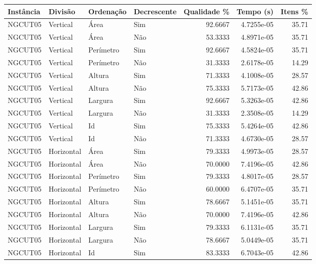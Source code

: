 \begin{tabular}{llllrrr}
\hline
Instância & Divisão     & Ordenação & Decrescente & Qualidade \% & Tempo (s)  & Itens \% \\
\hline
NGCUT05   & Vertical    & Área      & Sim         & 92.6667      & 4.7255e-05 & 35.71    \\
NGCUT05   & Vertical    & Área      & Não         & 53.3333      & 4.8971e-05 & 35.71    \\
NGCUT05   & Vertical    & Perímetro & Sim         & 92.6667      & 4.5824e-05 & 35.71    \\
NGCUT05   & Vertical    & Perímetro & Não         & 31.3333      & 2.6178e-05 & 14.29    \\
NGCUT05   & Vertical    & Altura    & Sim         & 71.3333      & 4.1008e-05 & 28.57    \\
NGCUT05   & Vertical    & Altura    & Não         & 75.3333      & 5.7173e-05 & 42.86    \\
NGCUT05   & Vertical    & Largura   & Sim         & 92.6667      & 5.3263e-05 & 42.86    \\
NGCUT05   & Vertical    & Largura   & Não         & 31.3333      & 2.3508e-05 & 14.29    \\
NGCUT05   & Vertical    & Id        & Sim         & 75.3333      & 5.4264e-05 & 42.86    \\
NGCUT05   & Vertical    & Id        & Não         & 71.3333      & 4.6730e-05 & 28.57    \\
NGCUT05   & Horizontal  & Área      & Sim         & 79.3333      & 4.9973e-05 & 28.57    \\
NGCUT05   & Horizontal  & Área      & Não         & 70.0000      & 7.4196e-05 & 42.86    \\
NGCUT05   & Horizontal  & Perímetro & Sim         & 79.3333      & 4.8017e-05 & 28.57    \\
NGCUT05   & Horizontal  & Perímetro & Não         & 60.0000      & 6.4707e-05 & 35.71    \\
NGCUT05   & Horizontal  & Altura    & Sim         & 78.6667      & 5.1451e-05 & 35.71    \\
NGCUT05   & Horizontal  & Altura    & Não         & 70.0000      & 7.4196e-05 & 42.86    \\
NGCUT05   & Horizontal  & Largura   & Sim         & 79.3333      & 6.1131e-05 & 35.71    \\
NGCUT05   & Horizontal  & Largura   & Não         & 78.6667      & 5.0449e-05 & 35.71    \\
NGCUT05   & Horizontal  & Id        & Sim         & 83.3333      & 6.7043e-05 & 42.86    \\

\end{tabular}
